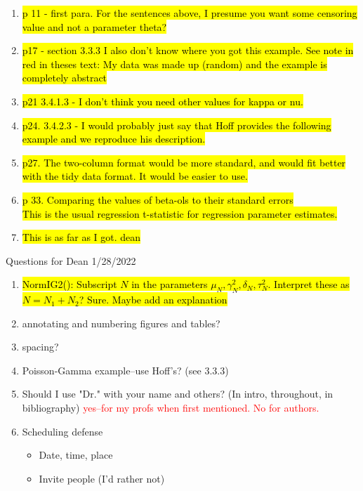 \documentclass[12pt, a4paper]{article}
\begin{document}
\begin{enumerate}
  \item \hl{p 11 - first para.  For the sentences above, I presume you want some censoring value and not a parameter theta?}
  \item \hl{p17 - section 3.3.3  I also don't know where you got this example. See note in red in theses text:  My data was made up (random) and the example is completely abstract}
  \item \hl{p21 3.4.1.3 - I don't think you need other values for kappa or nu.}
  \item \hl{p24. 3.4.2.3 - I would probably just say that Hoff provides the following example and we reproduce his description.}
  \item \hl{p27. The two-column format would be more standard, and would fit better with the tidy data format.  It would be easier to use.}
  \item \hl{p 33.  Comparing the values of beta-ols to their standard errors}\\
    \hl{This is the usual regression t-statistic for regression parameter estimates.}
  \item \hl{This is as far as I got.  dean}

\end{enumerate}

{\huge Questions for Dean 1/28/2022}
\begin{enumerate}
  \item \hl{NormIG2():  Subscript $N$ in the parameters $\mu_N,\gamma^2_N,\delta_N,\tau^2_N$. Interpret these as $N = N_1 + N_2$?  Sure.  Maybe add an explanation}
  \item annotating and numbering figures and tables?
  \item spacing?
  \item Poisson-Gamma example--use Hoff's? (see 3.3.3)
  \item Should I use "Dr." with  your name and others? (In intro, throughout, in bibliography) \textcolor{red}{yes--for my profs when first mentioned.  No for authors.}
  \item Scheduling defense
  \begin{itemize}
    \item Date, time, place
    \item Invite people (I'd rather not)
  \end{itemize}
\end{enumerate}
\end{document}
